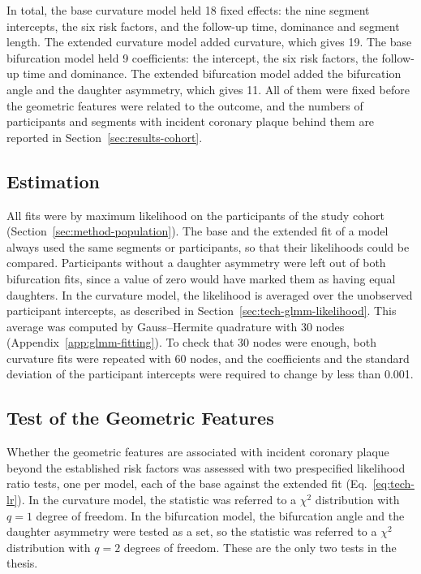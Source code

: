 In total, the base curvature model held 18 fixed effects: the nine segment intercepts, the six risk factors, and the follow-up time, dominance and segment length.
The extended curvature model added curvature, which gives 19.
The base bifurcation model held 9 coefficients: the intercept, the six risk factors, the follow-up time and dominance.
The extended bifurcation model added the bifurcation angle and the daughter asymmetry, which gives 11.
All of them were fixed before the geometric features were related to the outcome, and the numbers of participants and segments with incident coronary plaque behind them are reported in Section~\ref{sec:results-cohort}.

\subsection{Estimation}
\label{sec:method-estimation}

All fits were by maximum likelihood on the participants of the study cohort (Section~\ref{sec:method-population}).
The base and the extended fit of a model always used the same segments or participants, so that their likelihoods could be compared.
Participants without a daughter asymmetry were left out of both bifurcation fits, since a value of zero would have marked them as having equal daughters.
In the curvature model, the likelihood is averaged over the unobserved participant intercepts, as described in Section~\ref{sec:tech-glmm-likelihood}.
This average was computed by Gauss--Hermite quadrature with 30 nodes (Appendix~\ref{app:glmm-fitting}).
To check that 30 nodes were enough, both curvature fits were repeated with 60 nodes, and the coefficients and the standard deviation of the participant intercepts were required to change by less than 0.001.


\subsection{Test of the Geometric Features}
\label{sec:method-test}

Whether the geometric features are associated with incident coronary plaque beyond the established risk factors was assessed with two prespecified likelihood ratio tests, one per model, each of the base against the extended fit (Eq.~\eqref{eq:tech-lr}).
In the curvature model, the statistic was referred to a $\chi^2$ distribution with $q = 1$ degree of freedom.
In the bifurcation model, the bifurcation angle and the daughter asymmetry were tested as a set, so the statistic was referred to a $\chi^2$ distribution with $q = 2$ degrees of freedom.
These are the only two tests in the thesis.

